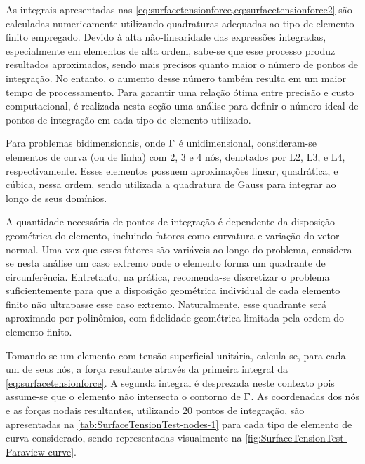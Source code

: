 \documentclass[Tese.tex]{subfiles}
\begin{document}
As integrais apresentadas nas \cref{eq:surfacetensionforce,eq:surfacetensionforce2} são calculadas numericamente utilizando quadraturas adequadas ao tipo de elemento finito empregado. Devido à alta não-linearidade das expressões integradas, especialmente em elementos de alta ordem, sabe-se que esse processo produz resultados aproximados, sendo mais precisos quanto maior o número de pontos de integração. No entanto, o aumento desse número também resulta em um maior tempo de processamento. Para garantir uma relação ótima entre precisão e custo computacional, é realizada nesta seção uma análise para definir o número ideal de pontos de integração em cada tipo de elemento utilizado.

Para problemas bidimensionais, onde $\Gamma$ é unidimensional, consideram-se elementos de curva (ou de linha) com $2$, $3$ e $4$ nós, denotados por L2, L3, e L4, respectivamente. Esses elementos possuem aproximações linear, quadrática, e cúbica, nessa ordem, sendo utilizada a quadratura de Gauss para integrar ao longo de seus domínios.

A quantidade necessária de pontos de integração é dependente da disposição geométrica do elemento, incluindo fatores como curvatura e variação do vetor normal. Uma vez que esses fatores são variáveis ao longo do problema, considera-se nesta análise um caso extremo onde o elemento forma um quadrante de circunferência. Entretanto, na prática, recomenda-se discretizar o problema suficientemente para que a disposição geométrica individual de cada elemento finito não ultrapasse esse caso extremo. Naturalmente, esse quadrante será aproximado por polinômios, com fidelidade geométrica limitada pela ordem do elemento finito. 

Tomando-se um elemento com tensão superficial unitária, calcula-se, para cada um de seus nós, a força resultante através da primeira integral da \cref{eq:surfacetensionforce}. A segunda integral é desprezada neste contexto pois assume-se que o elemento não intersecta o contorno de $\Gamma$. As coordenadas dos nós e as forças nodais resultantes, utilizando $20$ pontos de integração, são apresentadas na \cref{tab:SurfaceTensionTest-nodes-1} para cada tipo de elemento de curva considerado, sendo representadas visualmente na \cref{fig:SurfaceTensionTest-Paraview-curve}.
\end{document}
